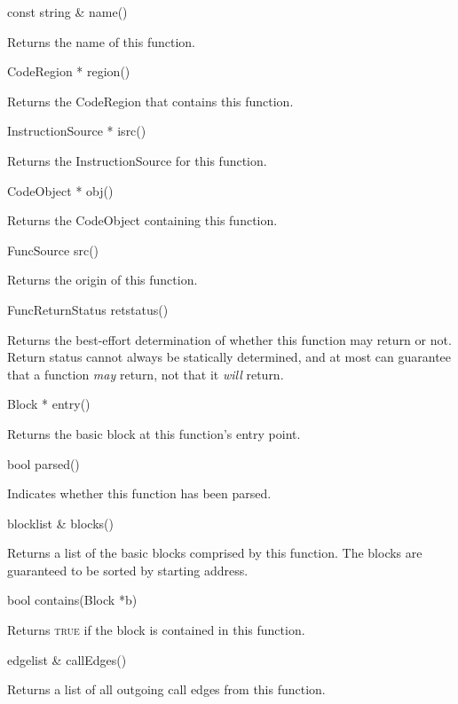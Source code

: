 \documentclass{article}
\newenvironment{apient}{\small\verbatim}{\endverbatim}
\newcommand{\apidesc}[1]{%
{\addtolength{\leftskip}{4em}%
#1\par\medskip}
}
\begin{document}
\begin{apient}
const string & name()
\end{apient}
\apidesc{Returns the name of this function.}

\begin{apient}
CodeRegion * region()
\end{apient}
\apidesc{Returns the CodeRegion that contains this function.}

\begin{apient}
InstructionSource * isrc()
\end{apient}
\apidesc{Returns the InstructionSource for this function.}

\begin{apient}
CodeObject * obj()
\end{apient}
\apidesc{Returns the CodeObject containing this function.}

\begin{apient}
FuncSource src()
\end{apient}
\apidesc{Returns the origin of this function.}

\begin{apient}
FuncReturnStatus retstatus()
\end{apient}
\apidesc{Returns the best-effort determination of whether this function may return or not. Return status cannot always be statically determined, and at most can guarantee that a function \emph{may} return, not that it \emph{will} return.}

\begin{apient}
Block * entry()
\end{apient}
\apidesc{Returns the basic block at this function's entry point.}

\begin{apient}
bool parsed()
\end{apient}
\apidesc{Indicates whether this function has been parsed.}

\begin{apient}
blocklist & blocks()
\end{apient}
\apidesc{Returns a list of the basic blocks comprised by this function. The blocks are guaranteed to be sorted by starting address.}

\begin{apient}
bool contains(Block *b)
\end{apient}
\apidesc{Returns {\scshape true} if the block is contained in this function.}

\begin{apient}
edgelist & callEdges()
\end{apient}
\apidesc{Returns a list of all outgoing call edges from this function.}
\end{document}
